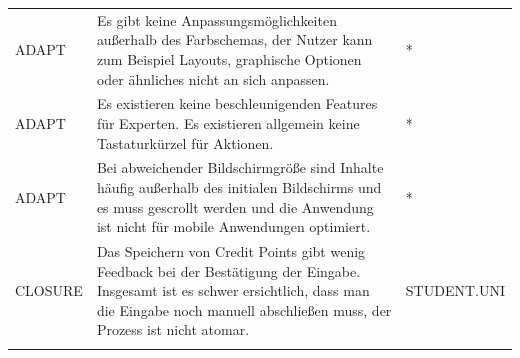 \documentclass[
  12pt,
  ngerman,
  a4paper,
]{article}
\begin{document}
\begin{longtable}[]{@{}lll@{}}
\begin{minipage}[t]{0.22\columnwidth}\raggedright
ADAPT\strut
\end{minipage} & \begin{minipage}[t]{0.52\columnwidth}\raggedright
Es gibt keine Anpassungsmöglichkeiten außerhalb des Farbschemas, der
Nutzer kann zum Beispiel Layouts, graphische Optionen oder ähnliches
nicht an sich anpassen.\strut
\end{minipage} & \begin{minipage}[t]{0.17\columnwidth}\raggedright
*\strut
\end{minipage}\tabularnewline
\begin{minipage}[t]{0.22\columnwidth}\raggedright
ADAPT\strut
\end{minipage} & \begin{minipage}[t]{0.52\columnwidth}\raggedright
Es existieren keine beschleunigenden Features für Experten. Es
existieren allgemein keine Tastaturkürzel für Aktionen.\strut
\end{minipage} & \begin{minipage}[t]{0.17\columnwidth}\raggedright
*\strut
\end{minipage}\tabularnewline
\begin{minipage}[t]{0.22\columnwidth}\raggedright
ADAPT\strut
\end{minipage} & \begin{minipage}[t]{0.52\columnwidth}\raggedright
Bei abweichender Bildschirmgröße sind Inhalte häufig außerhalb des
initialen Bildschirms und es muss gescrollt werden und die Anwendung ist
nicht für mobile Anwendungen optimiert.\strut
\end{minipage} & \begin{minipage}[t]{0.17\columnwidth}\raggedright
*\strut
\end{minipage}\tabularnewline
\begin{minipage}[t]{0.22\columnwidth}\raggedright
CLOSURE\strut
\end{minipage} & \begin{minipage}[t]{0.52\columnwidth}\raggedright
Das Speichern von Credit Points gibt wenig Feedback bei der Bestätigung
der Eingabe. Insgesamt ist es schwer ersichtlich, dass man die Eingabe
noch manuell abschließen muss, der Prozess ist nicht atomar.\strut
\end{minipage} & \begin{minipage}[t]{0.17\columnwidth}\raggedright
STUDENT.UNI\strut
\end{minipage}\tabularnewline
\begin{minipage}[t]{0.22\columnwidth}\raggedright

\end{minipage}
\end{longtable}
\end{document}
